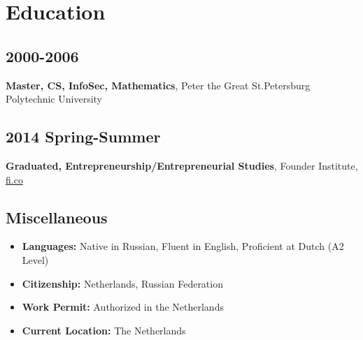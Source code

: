 \section*{Education}

\subsection*{2000-2006}
\textbf{Master, CS, InfoSec, Mathematics}, Peter the Great St.Petersburg Polytechnic University

\subsection*{2014 Spring-Summer}
\textbf{Graduated, Entrepreneurship/Entrepreneurial Studies}, Founder Institute, \href{https://fi.co}{\url{fi.co}}

\subsection*{Miscellaneous}
\begin{itemize}[noitemsep, nosep]
  \item \textbf{Languages:} Native in Russian, Fluent in English, Proficient at Dutch (A2 Level)
  \item \textbf{Citizenship:} Netherlands, Russian Federation
  \item \textbf{Work Permit:} Authorized in the Netherlands
  \item \textbf{Current Location:} The Netherlands
\end{itemize}

